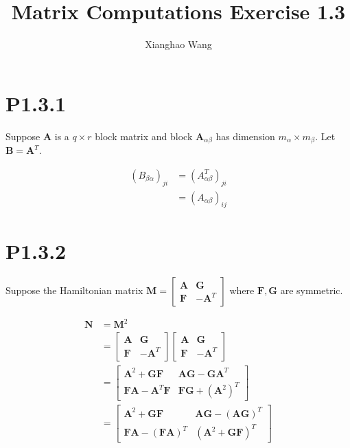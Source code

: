 \documentclass{article}
\author{Xianghao Wang}
\title{Matrix Computations Exercise 1.3}
\begin{document}
\maketitle

\section*{P1.3.1}

Suppose $\bm{A}$ is a $q\times r$ block matrix and block
$\bm{A}_{\alpha\beta}$ has dimension $m_{\alpha} \times m_{\beta}$.
Let $\bm{B}=\bm{A}^T$.

\begin{align*}
    (B_{\beta\alpha})_{ji} & = (A^T_{\alpha\beta})_{ji} \\
                           & = (A_{\alpha\beta})_{ij}
\end{align*}

\section*{P1.3.2}
Suppose the Hamiltonian matrix $\bm{M}=\begin{bmatrix}
        \bm{A} & \bm{G}    \\
        \bm{F} & -\bm{A}^T
    \end{bmatrix}$ where $\bm{F},\bm{G}$ are symmetric.

\begin{align*}
    \bm{N} & = \bm{M}^2                                       \\
           & =
    \begin{bmatrix}
        \bm{A} & \bm{G}    \\
        \bm{F} & -\bm{A}^T
    \end{bmatrix}
    \begin{bmatrix}
        \bm{A} & \bm{G}    \\
        \bm{F} & -\bm{A}^T
    \end{bmatrix}                                        \\
           & =
    \begin{bmatrix}
        \bm{A}^2+\bm{G}\bm{F}       & \bm{A}\bm{G}-\bm{G}\bm{A}^T \\
        \bm{F}\bm{A}-\bm{A}^T\bm{F} & \bm{F}\bm{G}+(\bm{A}^2)^T
    \end{bmatrix} \\
           & =
    \begin{bmatrix}
        \bm{A}^2+\bm{G}\bm{F}         & \bm{A}\bm{G}-(\bm{A}\bm{G})^T \\
        \bm{F}\bm{A}-(\bm{F}\bm{A})^T & (\bm{A}^2+\bm{G}\bm{F})^T
    \end{bmatrix}
\end{align*}
\end{document}
